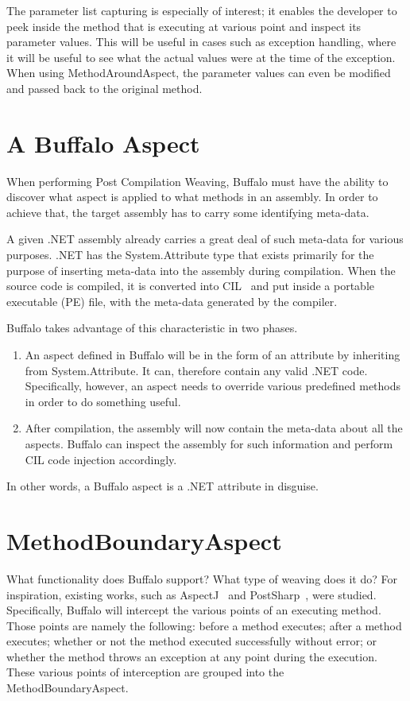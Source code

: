 The parameter list capturing is especially of interest; it enables the developer to peek inside the method that is executing at various point and inspect its parameter values. This will be useful in cases such as exception handling, where it will be useful to see what the actual values were at the time of the exception. When using MethodAroundAspect, the parameter values can even be modified and passed back to the original method.


\section{A Buffalo Aspect}

When performing Post Compilation Weaving, Buffalo must have the ability to discover what aspect is applied to what methods in an assembly. In order to achieve that, the target assembly has to carry some identifying meta-data.

A given .NET assembly already carries a great deal of such meta-data for various purposes. .NET has the System.Attribute type that exists primarily for the purpose of inserting meta-data into the assembly during compilation. When the source code is compiled, it is converted into CIL~\cite{msil_text} and put inside a portable executable (PE) file, with the meta-data generated by the compiler. 

Buffalo takes advantage of this characteristic in two phases.
\begin{enumerate}
	\item An aspect defined in Buffalo will be in the form of an attribute by inheriting from System.Attribute. It can, therefore contain any valid .NET code. Specifically, however, an aspect needs to override various predefined methods in order to do something useful.
	\item After compilation, the assembly will now contain the meta-data about all the aspects. Buffalo can inspect the assembly for such information and perform CIL code injection accordingly.
\end{enumerate}

In other words, a Buffalo aspect is a .NET attribute in disguise.

\section{MethodBoundaryAspect}
What functionality does Buffalo support? What type of weaving does it do? For inspiration, existing works, such as AspectJ~\cite{aspectj_faq} and PostSharp~\cite{postsharp}, were studied. Specifically, Buffalo will intercept the various points of an executing method. Those points are namely the following: before a method executes; after a method executes; whether or not the method executed successfully without error; or whether the method throws an exception at any point during the execution. These various points of interception are grouped into the MethodBoundaryAspect.

